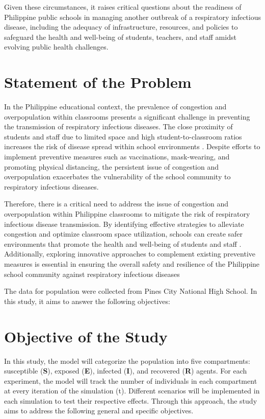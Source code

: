 Given these circumstances, it raises critical questions about the readiness of Philippine public schools in managing another outbreak of a respiratory infectious disease, including the adequacy of infrastructure, resources, and policies to safeguard the health and well-being of students, teachers, and staff amidst evolving public health challenges.

\section{Statement of the Problem}

In the Philippine educational context, the prevalence of congestion and overpopulation within classrooms presents a significant challenge in preventing the transmission of respiratory infectious diseases. The close proximity of students and staff due to limited space and high student-to-classroom ratios increases the risk of disease spread within school environments \cite{g_2023_facility}. Despite efforts to implement preventive measures such as vaccinations, mask-wearing, and promoting physical distancing, the persistent issue of congestion and overpopulation exacerbates the vulnerability of the school community to respiratory infectious diseases.

Therefore, there is a critical need to address the issue of congestion and overpopulation within Philippine classrooms to mitigate the risk of respiratory infectious disease transmission. By identifying effective strategies to alleviate congestion and optimize classroom space utilization, schools can create safer environments that promote the health and well-being of students and staff \cite{g_2023_facility}. Additionally, exploring innovative approaches to complement existing preventive measures is essential in ensuring the overall safety and resilience of the Philippine school community against respiratory infectious diseases

\indent \indent The data for population were collected from Pines City National High School. In this study, it aims to answer the following objectives:

\section{Objective of the Study}
\vspace{8pt} %
\indent \indent In this study, the model will categorize the population into five compartments: susceptible (\textbf{S}), exposed (\textbf{E}), infected (\textbf{I}), and recovered (\textbf{R}) agents. For each experiment, the model will track the number of individuals in each compartment at every iteration of the simulation (t). Different scenarios will be implemented in each simulation to test their respective effects. Through this approach, the study aims to address the following general and specific objectives.

